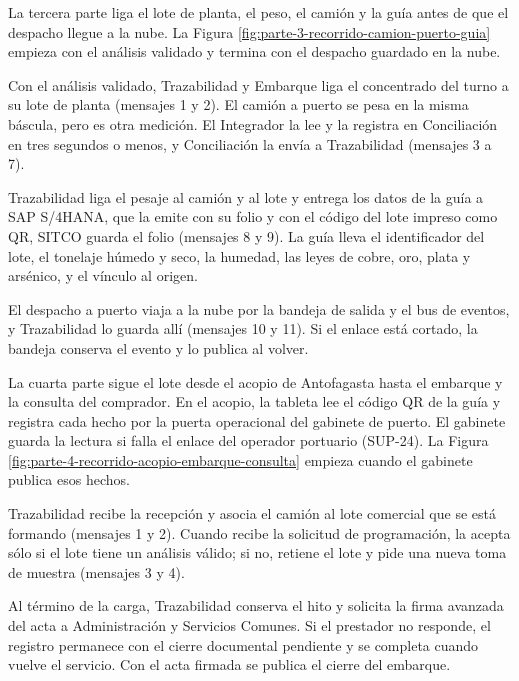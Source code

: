 \documentclass[subdoc]{../../comun/overfore}
\begin{document}
La tercera parte liga el lote de planta, el peso, el camión y la guía antes de que el despacho llegue a la nube. La Figura \ref{fig:parte-3-recorrido-camion-puerto-guia} empieza con el análisis validado y termina con el despacho guardado en la nube.

Con el análisis validado, Trazabilidad y Embarque liga el concentrado del turno a su lote de planta (mensajes 1 y 2). El camión a puerto se pesa en la misma báscula, pero es otra medición. El Integrador la lee y la registra en Conciliación en tres segundos o menos, y Conciliación la envía a Trazabilidad (mensajes 3 a 7).

Trazabilidad liga el pesaje al camión y al lote y entrega los datos de la guía a SAP S/4HANA, que la emite con su folio y con el código del lote impreso como QR, SITCO guarda el folio (mensajes 8 y 9). La guía lleva el identificador del lote, el tonelaje húmedo y seco, la humedad, las leyes de cobre, oro, plata y arsénico, y el vínculo al origen.

El despacho a puerto viaja a la nube por la bandeja de salida y el bus de eventos, y Trazabilidad lo guarda allí (mensajes 10 y 11). Si el enlace está cortado, la bandeja conserva el evento y lo publica al volver.

La cuarta parte sigue el lote desde el acopio de Antofagasta hasta el embarque y la consulta del comprador. En el acopio, la tableta lee el código QR de la guía y registra cada hecho por la puerta operacional del gabinete de puerto. El gabinete guarda la lectura si falla el enlace del operador portuario (SUP-24). La Figura \ref{fig:parte-4-recorrido-acopio-embarque-consulta} empieza cuando el gabinete publica esos hechos.

Trazabilidad recibe la recepción y asocia el camión al lote comercial que se está formando (mensajes 1 y 2). Cuando recibe la solicitud de programación, la acepta sólo si el lote tiene un análisis válido; si no, retiene el lote y pide una nueva toma de muestra (mensajes 3 y 4).

Al término de la carga, Trazabilidad conserva el hito y solicita la firma avanzada del acta a Administración y Servicios Comunes. Si el prestador no responde, el registro permanece con el cierre documental pendiente y se completa cuando vuelve el servicio. Con el acta firmada se publica el cierre del embarque.
\end{document}
